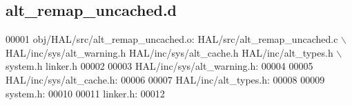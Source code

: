 \subsection{alt\+\_\+remap\+\_\+uncached.\+d}
\label{alt__remap__uncached_8d_source}

\begin{DoxyCode}
00001 obj/HAL/src/alt_remap_uncached.o: HAL/src/alt_remap_uncached.c \(\backslash\)
 HAL/inc/sys/alt\_warning.h HAL/inc/sys/alt\_cache.h HAL/inc/alt\_types.h \(\backslash\)
 system.h linker.h
00002 
00003 HAL/inc/sys/alt\_warning.h:
00004 
00005 HAL/inc/sys/alt\_cache.h:
00006 
00007 HAL/inc/alt\_types.h:
00008 
00009 system.h:
00010 
00011 linker.h:
00012 \end{DoxyCode}
